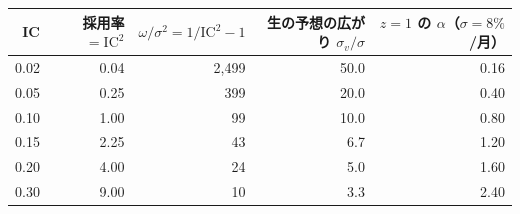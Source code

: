 \begin{tabular}{rrrrr}
\toprule
IC & 採用率 $=\mathrm{IC}^2$ & $\omega/\sigma^2=1/\mathrm{IC}^2-1$ & 生の予想の広がり $\sigma_v/\sigma$ & $z=1$ の $\alpha$（$\sigma=8\%$/月） \\
\midrule
0.02 & 0.04 & 2{,}499 & 50.0 & 0.16 \\
0.05 & 0.25 & 399 & 20.0 & 0.40 \\
0.10 & 1.00 & 99 & 10.0 & 0.80 \\
0.15 & 2.25 & 43 & 6.7 & 1.20 \\
0.20 & 4.00 & 24 & 5.0 & 1.60 \\
0.30 & 9.00 & 10 & 3.3 & 2.40 \\
\bottomrule
\end{tabular}
